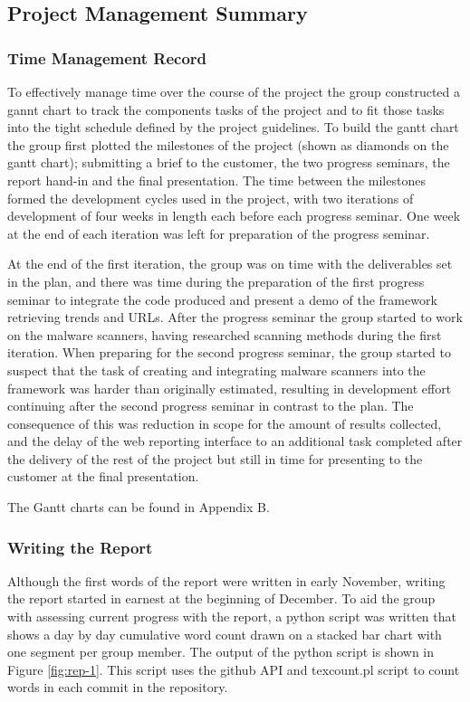 \subsection{Project Management Summary}

\subsubsection{Time Management Record}

To effectively manage time over the course of the project the group constructed
a gannt chart to track the components tasks of the project and to fit those tasks into the
tight schedule defined by the project guidelines. To build the gantt chart the
group first plotted the milestones of the project (shown as diamonds on the
gantt chart); submitting a brief to the
customer, the two progress seminars, the report hand-in and the final
presentation. The time between the milestones formed the development cycles
used in the project, with two iterations of development of four weeks in length
each before each progress seminar. One week at the end of each iteration was
left for preparation of the progress seminar.

At the end of the first iteration, the group was on time with the deliverables
set in the plan, and there was time during the preparation of the first progress
seminar to integrate the code produced and present a demo of the framework
retrieving trends and URLs. After the progress seminar the group started to work on
the malware scanners, having researched scanning methods during the first
iteration. When preparing for the second progress seminar, the group started to
suspect that the task of creating and integrating malware scanners into the
framework was harder than originally estimated, resulting in development effort
continuing after the second progress seminar in contrast to the plan. The
consequence of this was reduction in scope for the amount of results
collected, and the delay of the web reporting interface to an additional task
completed after the delivery of the rest of the project but still in time for
presenting to the customer at the final presentation.

The Gantt charts can be found in Appendix B.

\subsubsection{Writing the Report}

Although the first words of the report were written in early November, writing
the report started in earnest at the beginning of December. To aid the group
with assessing current progress with the report, a python script was written
that shows a day by day cumulative word count drawn on a stacked bar chart with
one segment per group member. The output of the python script is shown in Figure
\ref{fig:rep-1}.
This script uses the github API and texcount.pl script to count words in each
commit in the repository.

